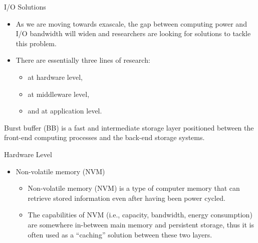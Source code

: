 \documentclass[compress,11pt,xcolor=svgnames,aspectratio=169]{beamer}
\begin{document}
\begin{frame}[t]{I/O Solutions}

\begin{itemize}

\item As we are moving towards exascale, the gap between computing power and I/O bandwidth will
widen and researchers are looking for solutions to tackle this problem.\\[0.4cm]

\item There are essentially three lines of research:\\[0.4cm]

    \begin{itemize}
    \setlength\itemsep{0.6cm}

      \item at hardware level,
      \item at middleware level,
      \item and at application level.

    \end{itemize}

\end{itemize}Burst buffer (BB) is a fast and intermediate storage layer positioned between the front-end computing processes and the back-end storage systems.

\end{frame}

\begin{frame}[t]{Hardware Level}

\begin{itemize}

    \item Non-volatile memory (NVM)\\[0.4cm]

    \begin{itemize}
    \setlength\itemsep{0.6cm}

        \item Non-volatile memory (NVM) is a type of computer memory that can retrieve stored information even after having been power cycled.

        \item The capabilities of NVM (i.e., capacity, bandwidth, energy consumption) are somewhere in-between main memory and persistent storage, thus it is often used as a ``caching'' solution between these two layers.

    \end{itemize}

\end{itemize}

\end{frame}
\end{document}
